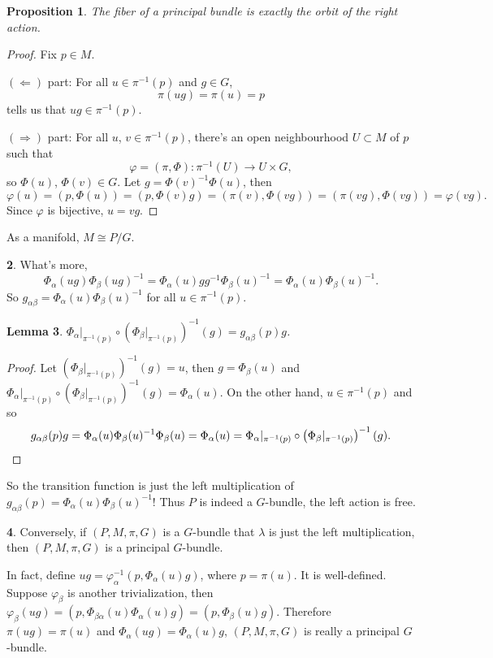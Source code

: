 \documentclass[11pt]{article}
\theoremstyle{definition}
\newtheorem{para}{}[part]
\theoremstyle{plain}
\newtheorem{pro}[para]{Proposition}
\newtheorem{lem}[para]{Lemma}
\begin{document}
\begin{pro}
The fiber of a principal bundle is exactly the orbit of the right action.
\end{pro}

\begin{proof}
	Fix $p\in M$. 

	$(\Leftarrow)$ part: For all $u\in\pi^{-1}(p)$ and $g\in G$,
	\[
		\pi(ug)=\pi(u)=p
	\]
	tells us that $ug\in \pi^{-1}(p)$. 

	$(\Rightarrow)$ part: For all $u$, $v\in\pi^{-1}(p)$, there's an open neighbourhood $U\subset M$ of $p$ such that
	\[
	\varphi=(\pi,\Phi):\pi^{-1}(U)\to U\times G,
	\]
	so $\Phi(u)$, $\Phi(v)\in G$. Let $g=\Phi(v)^{-1}\Phi(u)$, then
	\[
	\varphi(u)=(p,\Phi(u))=(p,\Phi(v)g)=(\pi(v),\Phi(vg))=(\pi(vg),\Phi(vg))=\varphi(vg).
	\]
	Since $\varphi$ is bijective, $u=vg$.
\end{proof}

As a manifold, $M\cong P/G$.

\begin{para}
What's more,
\[
	\Phi_{\alpha}(ug)\Phi_{\beta}(ug)^{-1}=\Phi_{\alpha}(u)gg^{-1}\Phi_{\beta}(u)^{-1}=\Phi_{\alpha}(u)\Phi_{\beta}(u)^{-1}.
\]
So $g_{\alpha\beta}=\Phi_{\alpha}(u)\Phi_{\beta}(u)^{-1}$ for all $u\in \pi^{-1}(p)$.
\end{para}

\begin{lem}\label{lem:8}
$\Phi_{\alpha}|_{\pi^{-1}(p)}\circ \left(\Phi_{\beta}|_{\pi^{-1}(p)}\right)^{-1}(g)=g_{\alpha\beta}(p)g$.
\end{lem}

\begin{proof}
	Let $\left(\Phi_{\beta}|_{\pi^{-1}(p)}\right)^{-1}(g)=u$, then $g=\Phi_\beta(u)$ and $\Phi_{\alpha}|_{\pi^{-1}(p)}\circ \left(\Phi_{\beta}|_{\pi^{-1}(p)}\right)^{-1}(g)=\Phi_{\alpha}(u)$. On the other hand, $u\in \pi^{-1}(p)$ and so
		\[
		g_{\alpha\beta}(p)g=\Phi_{\alpha}(u)\Phi_{\beta}(u)^{-1}\Phi_\beta(u)=\Phi_{\alpha}(u)=\Phi_{\alpha}|_{\pi^{-1}(p)}\circ \left(\Phi_{\beta}|_{\pi^{-1}(p)}\right)^{-1}(g).\qedhere
		\]
\end{proof}

So the transition function is just the left multiplication of $g_{\alpha\beta}(p)=\Phi_{\alpha}(u)\Phi_{\beta}(u)^{-1}$! Thus $P$ is indeed a $G$-bundle, the left action is free.

\begin{para}
Conversely, if $(P,M,\pi,G)$ is a $G$-bundle that $\lambda$ is just the left multiplication, then $(P,M,\pi,G)$ is a principal $G$-bundle.

In fact, define $ug=\varphi_{\alpha}^{-1}(p,\Phi_{\alpha}(u)g)$, where $p=\pi(u)$. It is well-defined. Suppose $\varphi_\beta$ is another trivialization, then $\varphi_\beta(ug)=(p,\Phi_{\beta\alpha}(u)\Phi_\alpha(u)g)=(p,\Phi_{\beta}(u)g)$. Therefore $\pi(ug)=\pi(u)$ and $\Phi_{\alpha}(ug)=\Phi_{\alpha}(u)g$, $(P,M,\pi,G)$ is really a principal $G$-bundle.
\end{para}
\end{document}
